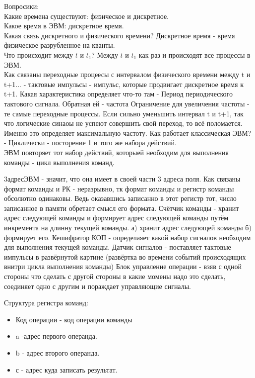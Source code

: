 \documentclass[12px]{article}
\begin{document}
Вопросики:\\
Какие времена существуют: физическое и дискретное.\\
Какое время в ЭВМ: дискретное время.\\
Какая связь дискретного и физического времени? Дискретное время - время физическое разрубленное на кванты. \\
Что происходит между $t$ и $t_1$? Между $t$ и $t_1$ как раз и происходят все процессы в ЭВМ. \\
Как связаны переходные процеесы с интервалом физического времени между t и t+1... - тактовые импульсы - импульс, которые продвигает дискретное время к t+1. 
Какая характеристика определяет что-то там - Период периодического тактового сигнала. 
Обратная ей - частота
Ограничение для увеличения частоты - те самые переходные процессы. Если сильно уменьшить интервал t и t+1, так что логические синаоы не успеют совершить свой переход, то всё поломается. Именно это определяет максимальную частоту. 
Как работает классическая ЭВМ? - Циклически - посторение 1 и того же набора действий. \\
ЭВМ повторяет тот набор действий, которыей необходим для выполнения команды - цикл выполнения команд. 

3адресЭВМ - значит, что она имеет в своей части 3 адреса поля. 
Как связаны формат команды и РК - неразрывно, тк формат команды и регистр команды обсолютно одинаковы. Ведь оказавшись записанно в этот регистр тот, число записанное в памяти обретает смысл его формата. 
Счётчик команды - хранит адрес следующей команды и формирует адрес следующей команды путём инкремента на длинну текущей команды. а) хранит адрес следующей команды б) формирует его.
Кешифратор КОП - определаяет какой набор сигналов необходим для выполнения текущей команды. 
Датчик сигналов - поставляет тактовые импульсы в развёрнутой картине (развёртка во времени событий происходящих внитри цикла выполнения команды)
Блок управление операции - взяв с одной стороны что сделать с другой стороны в какие момены надо это сделать, соединяет одно с другим и пораждает управляющие сигналы. 

Структура регистра команд:
\begin{itemize}
	\item Код операции - код операции команды
	\item a -адрес первого операнда. 
	\item b - адрес второго операнда.
	\item с - адрес куда записать результат. 
\end{itemize}
\end{document}
